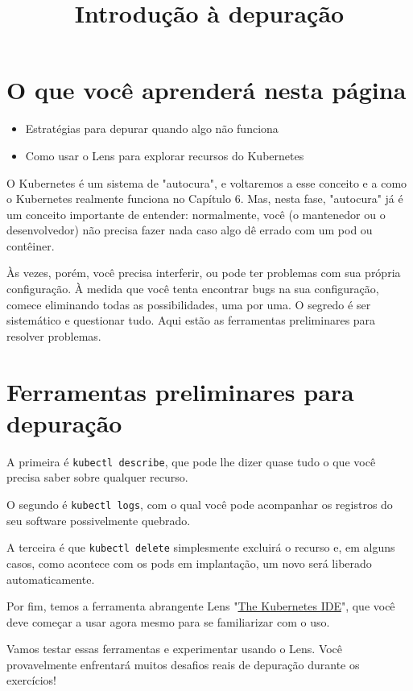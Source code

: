 \documentclass[11pt,a4paper]{article}
\title{\textbf{Introdução à depuração}}
\date{}
\begin{document}
\maketitle

\tableofcontents
\vspace{1em}

\section{O que você aprenderá nesta página}
\begin{itemize}
    \item Estratégias para depurar quando algo não funciona
    \item Como usar o Lens para explorar recursos do Kubernetes
\end{itemize}

O Kubernetes é um sistema de "autocura", e voltaremos a esse conceito e a como o Kubernetes realmente funciona no Capítulo 6. Mas, nesta fase, "autocura" já é um conceito importante de entender: normalmente, você (o mantenedor ou o desenvolvedor) não precisa fazer nada caso algo dê errado com um pod ou contêiner.

Às vezes, porém, você precisa interferir, ou pode ter problemas com sua própria configuração. À medida que você tenta encontrar bugs na sua configuração, comece eliminando todas as possibilidades, uma por uma. O segredo é ser sistemático e questionar tudo. Aqui estão as ferramentas preliminares para resolver problemas.

\section{Ferramentas preliminares para depuração}

A primeira é \texttt{kubectl describe}, que pode lhe dizer quase tudo o que você precisa saber sobre qualquer recurso.

O segundo é \texttt{kubectl logs}, com o qual você pode acompanhar os registros do seu software possivelmente quebrado.

A terceira é que \texttt{kubectl delete} simplesmente excluirá o recurso e, em alguns casos, como acontece com os pods em implantação, um novo será liberado automaticamente.

Por fim, temos a ferramenta abrangente Lens "\href{https://lenshq.io/}{The Kubernetes IDE}", que você deve começar a usar agora mesmo para se familiarizar com o uso.

Vamos testar essas ferramentas e experimentar usando o Lens. Você provavelmente enfrentará muitos desafios reais de depuração durante os exercícios!
\end{document}
